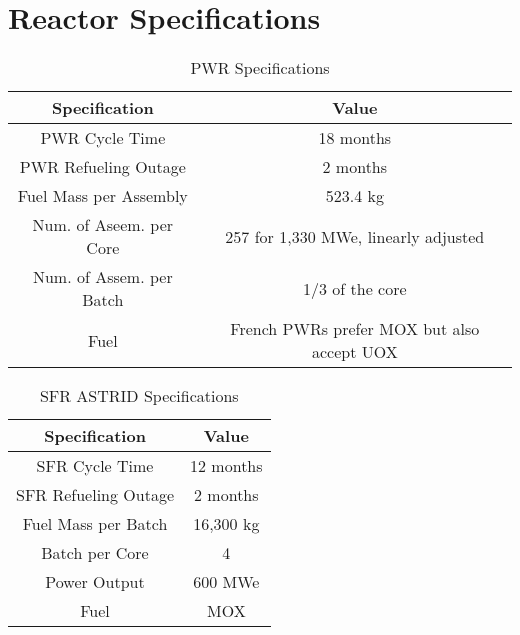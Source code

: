 \section{Reactor Specifications}



\begin{table}[h]
	\centering
	\label{tab:pwr}
	\begin{tabular}{|c|c|}
		\hline
		Specification & Value \\
		\hline
		PWR Cycle Time & 18 months \\ 
		PWR Refueling Outage & 2 months \\
		Fuel Mass per Assembly & 523.4 kg \\
		Num. of Aseem. per Core & 257 for 1,330 MWe, linearly adjusted\\
		Num. of Assem. per Batch & 1/3 of the core \\
		Fuel & French \glspl{PWR} prefer \gls{MOX} but also accept \gls{UOX}\\
		\hline
	\end{tabular}
	\caption {\gls{PWR} Specifications}
	\end{table}
	
\begin{table}[h]
	\centering
	\label{tab:sfr}
	\begin{tabular}{|c|c|}
		\hline
		Specification & Value \\
		\hline
		SFR Cycle Time & 12 months \\ 
		SFR Refueling Outage & 2 months \\
		Fuel Mass per Batch & 16,300 kg \\
		Batch per Core & 4 \\
		Power Output & 600 MWe \\
		Fuel & \gls{MOX}\\
		\hline
	\end{tabular}
	\caption {\gls{SFR} ASTRID Specifications}
	\cite{marsault-marie-sophie_pre-conceptual_2012}
\end{table}

